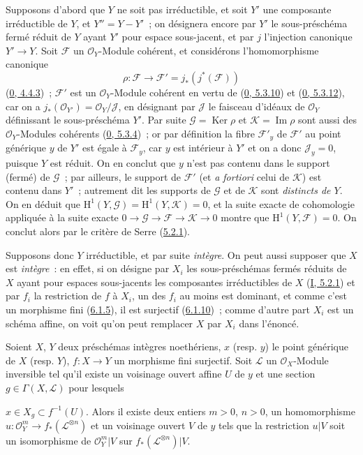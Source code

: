 Supposons d'abord que $Y$ ne soit pas irréductible, et soit $Y'$ une
composante irréductible de $Y$, et $Y''=Y-Y'$~; on désignera encore par
$Y'$ le sous-préschéma fermé réduit de $Y$ ayant $Y'$ pour espace
sous-jacent, et par $j$ l'injection canonique $Y'\to Y$. Soit $\mathcal{F}$
un $\mathcal{O}_Y$-Module cohérent, et considérons l'homomorphisme canonique
\[
\rho:\mathcal{F}\longrightarrow
\mathcal{F}'=j_*(j^*(\mathcal{F}))
\]
(\hyperref[0.4.4.3-fr]{0, 4.4.3})~; $\mathcal{F}'$ est un
$\mathcal{O}_Y$-Module cohérent en vertu de
(\hyperref[0.5.3.10-fr]{0, 5.3.10}) et
(\hyperref[0.5.3.12-fr]{0, 5.3.12}), car on a
$j_*(\mathcal{O}_{Y'})=\mathcal{O}_Y/\mathcal{J}$, en désignant par
$\mathcal{J}$ le faisceau d'idéaux de $\mathcal{O}_Y$ définissant le
sous-préschéma $Y'$. Par suite $\mathcal{G}=\operatorname{Ker}\rho$ et
$\mathcal{K}=\operatorname{Im}\rho$ sont aussi des $\mathcal{O}_Y$-Modules
cohérents (\hyperref[0.5.3.4-fr]{0, 5.3.4})~; or par définition la fibre
$\mathcal{F}'_y$ de $\mathcal{F}'$ au point générique $y$ de $Y'$ est égale
à $\mathcal{F}_y$, car $y$ est intérieur à $Y'$ et on a donc
$\mathcal{J}_y=0$, puisque $Y$ est réduit. On en conclut que $y$ n'est pas
contenu dans le support (fermé) de $\mathcal{G}$~; par ailleurs, le support de
$\mathcal{F}'$ (et \emph{a fortiori} celui de $\mathcal{K}$) est contenu
dans $Y'$~; autrement dit les supports de $\mathcal{G}$ et de $\mathcal{K}$
sont \emph{distincts de $Y$}. On en déduit que
$\mathrm{H}^1(Y,\mathcal{G})=\mathrm{H}^1(Y,\mathcal{K})=0$, et la suite
exacte de cohomologie appliquée à la suite exacte
$0\to\mathcal{G}\to\mathcal{F}\to\mathcal{K}\to0$ montre que
$\mathrm{H}^1(Y,\mathcal{F})=0$. On conclut alors par le critère de Serre
(\hyperref[II.5.2.1-fr]{5.2.1}).

Supposons donc $Y$ irréductible, et par suite \emph{intègre}. On peut aussi
supposer que $X$ est \emph{intègre}~: en effet, si on désigne par $X_i$ les
sous-préschémas fermés réduits de $X$ ayant pour espaces sous-jacents les
composantes irréductibles de $X$ (\hyperref[I.5.2.1-fr]{I, 5.2.1}) et par
$f_i$ la restriction de $f$ à $X_i$, un des $f_i$ au moins est dominant, et
comme c'est un morphisme fini (\hyperref[II.6.1.5-fr]{6.1.5}), il est
surjectif (\hyperref[II.6.1.10-fr]{6.1.10})~; comme d'autre part $X_i$ est un
schéma affine, on voit qu'on peut remplacer $X$ par $X_i$ dans l'énoncé.

\begin{lemma}[6.7.1.1]
\label{II.6.7.1.1-fr}
Soient $X$, $Y$ deux préschémas intègres noethériens, $x$ (resp. $y$) le
point générique de $X$ (resp. $Y$), $f:X\to Y$ un morphisme fini surjectif.
Soit $\mathcal{L}$ un $\mathcal{O}_X$-Module inversible tel qu'il existe un
voisinage ouvert affine $U$ de $y$ et une section
$g\in\Gamma(X,\mathcal{L})$ pour lesquels


$x\in X_g\subset f^{-1}(U)$. Alors il existe deux entiers $m>0$, $n>0$, un
homomorphisme
$u:\mathcal{O}_Y^m\to f_*(\mathcal{L}^{\otimes n})$ et un voisinage ouvert
$V$ de $y$ tels que la restriction $u|V$ soit un isomorphisme de
$\mathcal{O}_Y^m|V$ sur $f_*(\mathcal{L}^{\otimes n})|V$.
\end{lemma}

